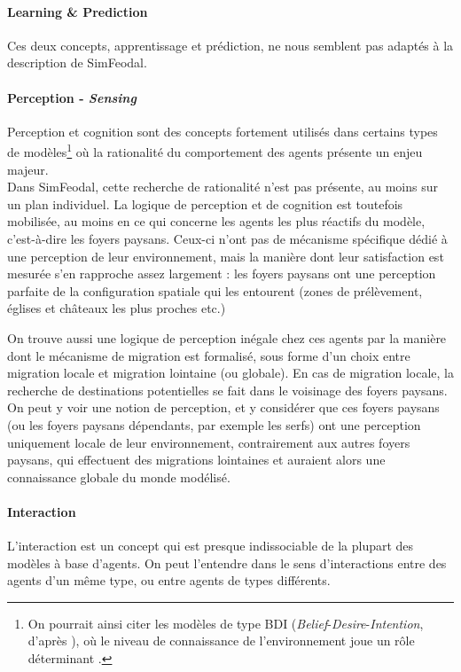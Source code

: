 \paragraph{Learning \& Prediction} Ces deux concepts, apprentissage et prédiction, ne nous semblent pas adaptés à la description de SimFeodal.

\paragraph{Perception - \textit{Sensing}}
Perception et cognition sont des concepts fortement utilisés dans certains types de modèles\footnote{
	On pourrait ainsi citer les modèles de type \og BDI\fg{} (\textit{Belief}-\textit{Desire}-\textit{Intention}, d'après \cite{bratman1988plans}), où le niveau de connaissance de l'environnement joue un rôle déterminant \autocite[183--184]{crooks_agent-based_2019}.
} où la rationalité du comportement des agents présente un enjeu majeur.\\
Dans SimFeodal, cette recherche de rationalité n'est pas présente, au moins sur un plan individuel.
La logique de perception et de cognition est toutefois mobilisée, au moins en ce qui concerne les agents les plus réactifs du modèle, c'est-à-dire les foyers paysans.
Ceux-ci n'ont pas de mécanisme spécifique dédié à une perception de leur environnement, mais la manière dont leur satisfaction est mesurée s'en rapproche assez largement : les foyers paysans ont une perception parfaite de la configuration spatiale qui les entourent (zones de prélèvement, églises et châteaux les plus proches etc.)

On trouve aussi une logique de perception inégale chez ces agents par la manière dont le mécanisme de migration est formalisé, sous forme d'un choix entre migration locale et migration lointaine (ou globale).
En cas de migration locale, la recherche de destinations potentielles se fait dans le voisinage des foyers paysans.
On peut y voir une notion de perception, et y considérer que ces foyers paysans (ou les foyers paysans \og dépendants\fg{}, par exemple les serfs) ont une perception uniquement locale de leur environnement, contrairement aux autres foyers paysans, qui effectuent des migrations lointaines et auraient alors une connaissance globale du monde modélisé.

\paragraph{Interaction} L'interaction est un concept qui est presque indissociable de la plupart des modèles à base d'agents.
On peut l'entendre dans le sens d'interactions entre des agents d'un même type, ou entre agents de types différents.

